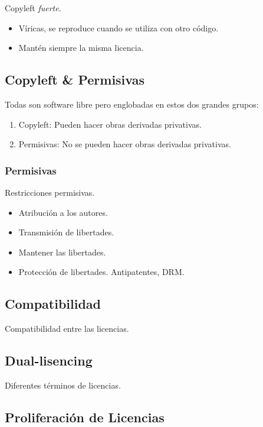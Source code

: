 \documentclass[11pt]{scrartcl}
\begin{document}
Copyleft \emph{fuerte}.
\begin{itemize}
	\item V\'iricas, se reproduce cuando se utiliza con otro c\'odigo.
	\item Mant\'en siempre la misma licencia.
\end{itemize}

\subsection{Copyleft \& Permisivas}

Todas son software libre pero englobadas en estos dos grandes grupos:
\begin{enumerate}
	\item Copyleft: Pueden hacer obras derivadas privativas.
	\item Permisivas: No se pueden hacer obras derivadas privativas.
\end{enumerate}

\subsubsection{Permisivas}

Restricciones permisivas.
\begin{itemize}
	\item Atribuci\'on a los autores.
	\item Transmisi\'on de libertades.
	\item Mantener las libertades.	
	\item Protecci\'on de libertades. Antipatentes, DRM.
\end{itemize}

\subsection{Compatibilidad}

Compatibilidad entre las licencias.

\subsection{Dual-lisencing}

Diferentes t\'erminos de licencias.

\subsection{Proliferaci\'on de Licencias}
\end{document}

